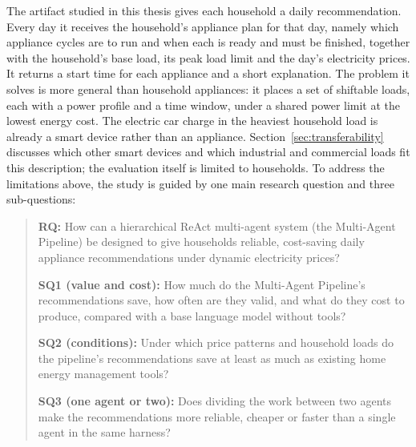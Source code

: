 \documentclass[12pt,a4paper]{report}
\begin{document}
The artifact studied in this thesis gives each household a daily
recommendation. Every day it receives the household's appliance plan for
that day, namely which appliance cycles are to run and when each is
ready and must be finished, together with the household's base load,
its peak load limit and the day's electricity prices. It returns a start
time for each appliance and a short explanation. The problem it solves
is more general than household appliances: it places a set of shiftable
loads, each with a power profile and a time window, under a shared power
limit at the lowest energy cost. The electric car charge in the heaviest
household load is already a smart device rather than an appliance.
Section~\ref{sec:transferability} discusses which other smart devices
and which industrial and commercial loads fit this description; the
evaluation itself is limited to households. To address the
limitations above, the study is guided by one main research question and
three sub-questions:

\begin{quote}
\textbf{RQ:} How can a hierarchical ReAct multi-agent system (the
Multi-Agent Pipeline) be designed to give households reliable,
cost-saving daily appliance recommendations under dynamic electricity
prices?

\textbf{SQ1 (value and cost):} How much do the Multi-Agent Pipeline's
recommendations save, how often are they valid, and what do they cost to
produce, compared with a base language model without tools?

\textbf{SQ2 (conditions):} Under which price patterns and household
loads do the pipeline's recommendations save at least as much as existing home
energy management tools?

\textbf{SQ3 (one agent or two):} Does dividing the work between two
agents make the recommendations more reliable, cheaper or faster than a
single agent in the same harness?
\end{quote}
\end{document}
